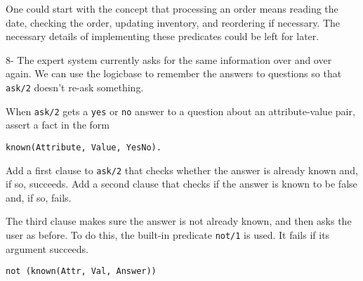 One could start with the concept that processing an order means reading the
date, checking the order, updating inventory, and reordering if necessary. The
necessary details of implementing these predicates could be left for later.


8- The expert system currently asks for the same information over and over
again. We can use the logicbase to remember the answers to questions so that
\verb'ask/2' doesn't re-ask something.

When \verb'ask/2' gets a \verb'yes' or \verb'no' answer to a question about an
attribute-value pair, assert a fact in the form

\begin{verbatim}
known(Attribute, Value, YesNo).
\end{verbatim}
Add a first clause to \verb'ask/2' that checks whether the answer is already
known and, if so, succeeds. Add a second clause that checks if the answer is
known to be false and, if so, fails.

The third clause makes sure the answer is not already known, and then asks the
user as before. To do this, the built-in predicate \verb'not/1' is used. It
fails if its argument succeeds.
\begin{verbatim}
not (known(Attr, Val, Answer))
\end{verbatim}

\secup
\secup
